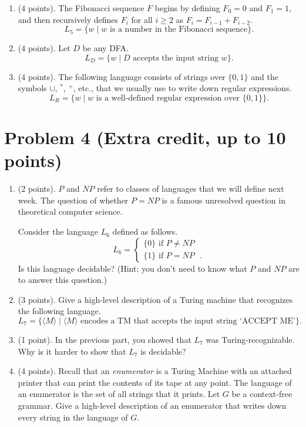 \documentclass[letterpaper,11pt,twoside]{article}
\theoremstyle{plain}
\theoremstyle{definition}
\theoremstyle{remark}
\theoremstyle{restate}
\begin{document}
\begin{enumerate}
    \item (4 points).
    The Fibonacci sequence $F$ begins by defining $F_0 = 0$ and $F_1 = 1$, and then recursively defines $F_i$ for all $i \geq 2$ as $F_i = F_{i-1} + F_{i-2}$.
    \[
        L_5 = \{w \; | \; w \text{ is a number in the Fibonacci sequence}\}.
    \]
    
    \item (4 points). Let $D$ be any DFA.
    \[
        L_D = \{w \; | \; D \text{ accepts the input string } w\}.
    \]
    
    \item (4 points). The following language consists of strings over $\{0,1\}$ and the symbols $\cup$, $^*$, $^+$, etc., that we usually use to write down regular expressions. 
    \[
        L_R = \{w \; | \; w \text{ is a well-defined regular expression over $\{0,1\}$}\}.
    \]
\end{enumerate}

\clearpage
\section{Problem 4 (Extra credit, up to 10 points)}
\begin{enumerate}
    \item (2 points). $P$ and $NP$ refer to classes of languages that we will define next week. The question of whether $P = NP$ is a famous unresolved question in theoretical computer science.
    
    Consider the language $L_6$ defined as follows. 
    \[
    L_6 = 
        \begin{cases}
            \{0\} \text{ if $P \neq NP$ } \\
            \{1\} \text{ if $P = NP$ }.
        \end{cases}
    \]
    Is this language decidable? (Hint: you don't need to know what $P$ and $NP$ are to answer this question.)
    
    \item (3 points). Give a high-level description of a Turing machine that recognizes the following language.
    \[
    L_7 = \{\langle M\rangle \; | \; \langle M\rangle \text{ encodes a TM that accepts the input string `ACCEPT ME'}\}.
    \]
    
    \item (1 point). In the previous part, you showed that $L_7$ was Turing-recognizable. Why is it harder to show that $L_7$ is decidable?
    
    \item (4 points). Recall that an \emph{enumerator} is a Turing Machine with an attached printer that can print the contents of its tape at any point. The language of an enumerator is the set of all strings that it prints. Let $G$ be a context-free grammar. Give a high-level description of an enumerator that writes down every string in the language of $G$.
\end{enumerate}
\end{document}

